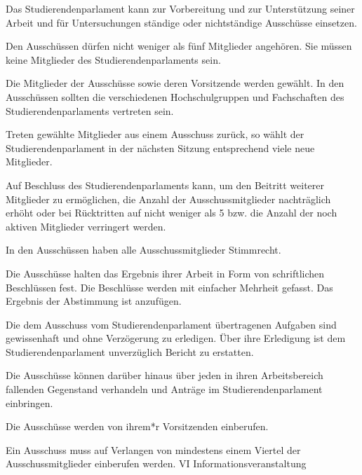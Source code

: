 \documentclass[10pt,a4paper]{scrartcl}
\begin{document}
\begin{contract}


\label{wahl-der-ausschuxfcsse}

Das Studierendenparlament kann zur Vorbereitung und zur Unterstützung
seiner Arbeit und für Untersuchungen ständige oder nichtständige
Ausschüsse einsetzen.

Den Ausschüssen dürfen nicht weniger als fünf Mitglieder angehören.
Sie müssen keine Mitglieder des Studierendenparlaments sein.

Die Mitglieder der Ausschüsse sowie deren Vorsitzende werden gewählt.
In den Ausschüssen sollten die verschiedenen Hochschulgruppen und
Fachschaften des Studierendenparlaments vertreten sein.

Treten gewählte Mitglieder aus einem Ausschuss zurück, so wählt der
Studierendenparlament in der nächsten Sitzung entsprechend viele neue
Mitglieder.

Auf Beschluss des Studierendenparlaments kann, um den Beitritt
weiterer Mitglieder zu ermöglichen, die Anzahl der Ausschussmitglieder
nachträglich erhöht oder bei Rücktritten auf nicht weniger als 
5 bzw. die Anzahl der noch aktiven Mitglieder verringert werden.



\label{stimmrecht}

In den Ausschüssen haben alle Ausschussmitglieder Stimmrecht.


\label{beschlussfassung-der-ausschuxfcsse}

Die Ausschüsse halten das Ergebnis ihrer Arbeit in Form von
schriftlichen Beschlüssen fest. Die Beschlüsse werden mit einfacher
Mehrheit gefasst. Das Ergebnis der Abstimmung ist anzufügen.


\label{aufgaben-und-rechte-der-ausschuxfcsse}

  Die dem Ausschuss vom Studierendenparlament übertragenen Aufgaben sind
  gewissenhaft und ohne Verzögerung zu erledigen. Über ihre Erledigung
  ist dem Studierendenparlament unverzüglich Bericht zu erstatten.

  Die Ausschüsse können darüber hinaus über jeden in ihren
  Arbeitsbereich fallenden Gegenstand verhandeln und Anträge im
  Studierendenparlament einbringen.



\label{sitzungen}

  Die Ausschüsse werden von ihrem*r Vorsitzenden einberufen.

  Ein Ausschuss muss auf Verlangen von mindestens einem Viertel der
  Ausschussmitglieder einberufen werden. VI Informationsveranstaltung

\end{contract}
\end{document}
